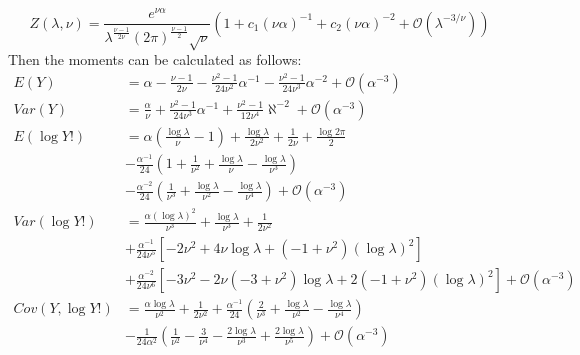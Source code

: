 \documentclass[aoas]{imsart}
\theoremstyle{plain}
\theoremstyle{remark}
\begin{document}
\begin{appendix}
\begin{equation}
	Z(\lambda, \nu)=\frac{e^{\nu\alpha}}{\lambda^{\frac{\nu-1}{2\nu}}(2\pi)^\frac{\nu-1}{2}\sqrt{\nu}}(1+c_1(\nu\alpha)^{-1} + c_2(\nu\alpha)^{-2} + \mathcal{O}(\lambda^{-3/\nu}))
\end{equation}
Then the moments can be calculated as follows:
\begin{align}
	E(Y) &= \alpha - \frac{\nu-1}{2\nu} - \frac{\nu^2-1}{24\nu^2}\alpha^{-1}-\frac{\nu^2-1}{24\nu^3}\alpha^{-2} + \mathcal{O}(\alpha^{-3})\\
	Var(Y) &= \frac{\alpha}{\nu} + \frac{\nu^2-1}{24\nu^3}\alpha^{-1} + \frac{\nu^2-1}{12\nu^4}\aleph^{-2} + \mathcal{O}(\alpha^{-3}) \nonumber\\
	E(\log Y!) &= \alpha\left(\frac{\log\lambda}{\nu} - 1\right) + \frac{\log\lambda}{2\nu^2} + \frac{1}{2\nu} + \frac{\log 2\pi}{2} \nonumber \\
	&- \frac{\alpha^{-1}}{24}\left(1 + \frac{1}{\nu^2} + \frac{\log\lambda}{\nu} - \frac{\log\lambda}{\nu^3}\right) \nonumber\\
	&- \frac{\alpha^{-2}}{24}\left(\frac{1}{\nu^3} + \frac{\log\lambda}{\nu^2} - \frac{\log \lambda}{\nu^4}\right) + \mathcal{O}(\alpha^{-3}) \nonumber \\
	Var(\log Y!) &= \frac{\alpha(\log\lambda)^2}{\nu^3} + \frac{\log\lambda}{\nu^3} + \frac{1}{2\nu^2} \nonumber\\
	&+ \frac{\alpha^{-1}}{24\nu^5}[-2\nu^2 + 4\nu\log\lambda + (-1 + \nu^2)(\log\lambda)^2] \nonumber\\
	&+ \frac{\alpha^{-2}}{24\nu^6}[-3\nu^2 - 2\nu(-3 + \nu^2)\log\lambda + 2(-1 + \nu^2)(\log\lambda)^2] + \mathcal{O}(\alpha^{-3}) \nonumber \\
	Cov(Y, \log Y!) &= \frac{\alpha\log\lambda}{\nu^2} + \frac{1}{2\nu^2} + \frac{\alpha^{-1}}{24}\left(\frac{2}{\nu^3} + \frac{\log\lambda}{\nu^2} - \frac{\log\lambda}{\nu^4}\right) \nonumber\\
	&-\frac{1}{24\alpha^2}\left(\frac{1}{\nu^2} - \frac{3}{\nu^4} - \frac{2\log\lambda}{\nu^3} + \frac{2\log\lambda}{\nu^5}\right) + \mathcal{O}(\alpha^{-3}) \nonumber
\end{align}



\end{appendix}
\end{document}
